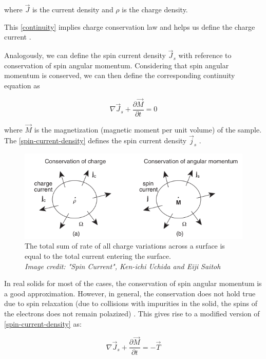 where $ \vec{J} $ is the current density and $ \rho $ is the charge density.

This \cref{continuity} implies charge conservation law and helps us define the charge current \cite{jackson1999classical}.

Analogously, we can define the spin current density $ \vec{J}_s $ with reference to conservation of spin angular momentum. Considering that spin angular momentum is conserved, we can then define the corresponding continuity equation as

\begin{equation} \label{spin-current-density}
    \nabla \vec{J}_s + \frac{\partial \vec{M}}{\partial t} = 0
\end{equation}

where $ \vec{M} $ is the magnetization (magnetic moment per unit volume) of the sample. The \cref{spin-current-density} defines the spin current density $ \vec{j}_s $ \cite{Uchida_2016}.

\begin{figure}[h!]
    \includegraphics[width=\columnwidth]{spin-current.png}
    \caption{The total sum of rate of all charge variations across a surface is equal to the total current entering the surface.\\ \vspace{0.2cm} \textit{Image credit: "Spin Current", Ken-ichi Uchida and Eiji Saitoh}}
\end{figure}


In real solids for most of the cases, the conservation of spin angular momentum is a good approximation. However, in general, the conservation does not hold true due to spin relaxation (due to collisions with impurities in the solid, the spins of the electrons does not remain polazized) \cite{Uchida_2016}. This gives rise to a modified version of \cref{spin-current-density} as:

\begin{equation}
    \nabla \vec{J}_s + \frac{\partial \vec{M}}{\partial t} = -\vec{T}
\end{equation}

